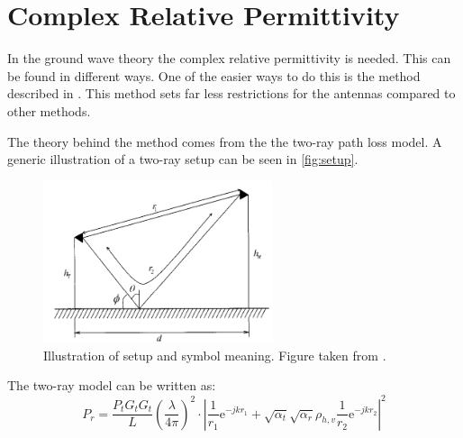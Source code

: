 \chapter{Complex Relative Permittivity}

In the ground wave theory the complex relative permittivity is needed. This can be found in different ways\citep{Kim}. One of the easier ways to do this is the method described in \citep{Kim}. This method sets far less restrictions for the antennas compared to other methods\citep{Kim}. 

The theory behind the method comes from the the two-ray path loss model. A generic illustration of a two-ray setup can be seen in \autoref{fig:setup}.

\begin{figure}[H]
\centering
\includegraphics[width=0.6\textwidth]{figure/setup.png}
\caption{Illustration of setup and symbol meaning. Figure taken from \citep{Kim}.}
\label{fig:setup}
\end{figure}


The two-ray model can be written as\citep{Kim}:
\begin{equation}\label{two-ray}
P_r=\frac{P_tG_tG_t}{L}\left(\frac{\lambda}{4\pi}\right)^2\cdot\left|\frac{1}{r_1}\text{e}^{-jkr_1}+\sqrt{\alpha_t}\sqrt{\alpha_r}\rho_{h,v}\frac{1}{r_2}\text{e}^{-jkr_2}\right|^2
\end{equation}
\begin{where}
\\
\end{where}

